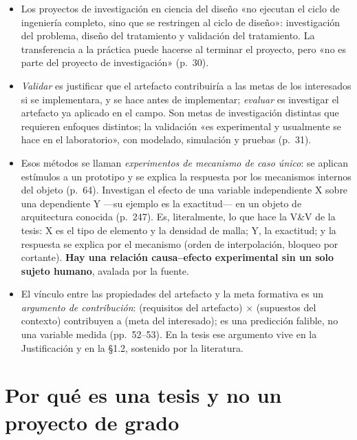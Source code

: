 \documentclass[11pt,a4paper]{article}
\begin{document}
\begin{itemize}
\item Los proyectos de investigación en ciencia del diseño «no ejecutan el ciclo de ingeniería completo, sino que se restringen al ciclo de diseño»: investigación del problema, diseño del tratamiento y validación del tratamiento. La transferencia a la práctica puede hacerse al terminar el proyecto, pero «no es parte del proyecto de investigación» (p.~30).
\item \emph{Validar} es justificar que el artefacto contribuiría a las metas de los interesados si se implementara, y se hace antes de implementar; \emph{evaluar} es investigar el artefacto ya aplicado en el campo. Son metas de investigación distintas que requieren enfoques distintos; la validación «es experimental y usualmente se hace en el laboratorio», con modelado, simulación y pruebas (p.~31).
\item Esos métodos se llaman \emph{experimentos de mecanismo de caso único}: se aplican estímulos a un prototipo y se explica la respuesta por los mecanismos internos del objeto (p.~64). Investigan el efecto de una variable independiente X sobre una dependiente Y —su ejemplo es la exactitud— en un objeto de arquitectura conocida (p.~247). Es, literalmente, lo que hace la V\&V de la tesis: X es el tipo de elemento y la densidad de malla; Y, la exactitud; y la respuesta se explica por el mecanismo (orden de interpolación, bloqueo por cortante). \textbf{Hay una relación causa--efecto experimental sin un solo sujeto humano}, avalada por la fuente.
\item El vínculo entre las propiedades del artefacto y la meta formativa es un \emph{argumento de contribución}: (requisitos del artefacto) $\times$ (supuestos del contexto) contribuyen a (meta del interesado); es una predicción falible, no una variable medida (pp.~52--53). En la tesis ese argumento vive en la Justificación y en la §1.2, sostenido por la literatura.
\end{itemize}

\section{Por qué es una tesis y no un proyecto de grado}
\label{sec:tesis}
\end{document}
